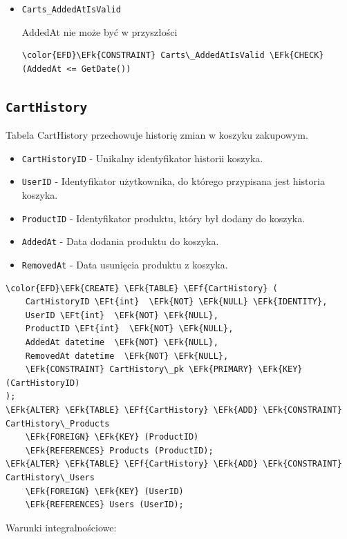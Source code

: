 \documentclass[11pt]{article}
\newcommand{\EFk}[1]{\textcolor{EFk}{\textbf{#1}}} %
\newcommand{\EFf}[1]{\textcolor{EFf}{#1}} %
\newcommand{\EFt}[1]{\textcolor{EFt}{\textbf{#1}}} %
\begin{document}
\begin{itemize}
\item \texttt{Carts\_AddedAtIsValid}

AddedAt nie może być w przyszłości
\begin{Code}
\begin{Verbatim}
\color{EFD}\EFk{CONSTRAINT} Carts\_AddedAtIsValid \EFk{CHECK}
(AddedAt <= GetDate())
\end{Verbatim}
\end{Code}
\end{itemize}
\subsection{\texttt{CartHistory}}
\label{sec:orgedaae55}
Tabela CartHistory przechowuje historię zmian w koszyku zakupowym.
\begin{itemize}
\item \texttt{CartHistoryID} - Unikalny identyfikator historii koszyka.
\item \texttt{UserID} - Identyfikator użytkownika, do którego przypisana jest historia koszyka.
\item \texttt{ProductID} - Identyfikator produktu, który był dodany do koszyka.
\item \texttt{AddedAt} - Data dodania produktu do koszyka.
\item \texttt{RemovedAt} - Data usunięcia produktu z koszyka.
\end{itemize}
\begin{Code}
\begin{Verbatim}
\color{EFD}\EFk{CREATE} \EFk{TABLE} \EFf{CartHistory} (
    CartHistoryID \EFt{int}  \EFk{NOT} \EFk{NULL} \EFk{IDENTITY},
    UserID \EFt{int}  \EFk{NOT} \EFk{NULL},
    ProductID \EFt{int}  \EFk{NOT} \EFk{NULL},
    AddedAt datetime  \EFk{NOT} \EFk{NULL},
    RemovedAt datetime  \EFk{NOT} \EFk{NULL},
    \EFk{CONSTRAINT} CartHistory\_pk \EFk{PRIMARY} \EFk{KEY}  (CartHistoryID)
);
\EFk{ALTER} \EFk{TABLE} \EFf{CartHistory} \EFk{ADD} \EFk{CONSTRAINT} CartHistory\_Products
    \EFk{FOREIGN} \EFk{KEY} (ProductID)
    \EFk{REFERENCES} Products (ProductID);
\EFk{ALTER} \EFk{TABLE} \EFf{CartHistory} \EFk{ADD} \EFk{CONSTRAINT} CartHistory\_Users
    \EFk{FOREIGN} \EFk{KEY} (UserID)
    \EFk{REFERENCES} Users (UserID);
\end{Verbatim}
\end{Code}
Warunki integralnościowe:
\end{document}
